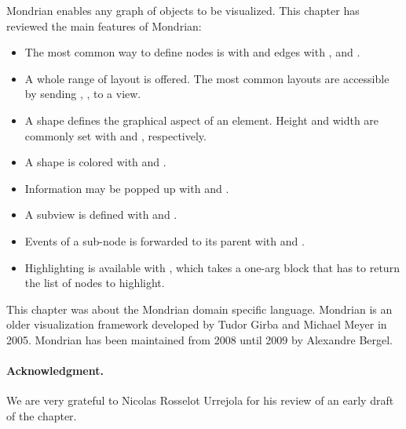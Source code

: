\documentclass[a4paper,10pt,twoside]{book}
\begin{document}
Mondrian enables any graph of objects to be visualized. This chapter has reviewed the main features of Mondrian:
\begin{itemize}
\item The most common way to define nodes is with  and edges with ,  and .
\item A whole range of layout is offered. The most common layouts are accessible by sending , ,  to a view.
\item A shape defines the graphical aspect of an element. Height and width are commonly set with  and , respectively. 
\item A shape is colored with  and .
\item Information may be popped up with  and .
\item A subview is defined with  and .
\item Events of a sub-node is forwarded to its parent with  and .
\item Highlighting is available with , which takes a one-arg block that has to return the list of nodes to highlight.
\end{itemize}

This chapter was about the Mondrian domain specific language. 
Mondrian is an older visualization framework developed by Tudor Girba and Michael Meyer in 2005. Mondrian has been maintained from 2008 until 2009 by Alexandre Bergel. 


\paragraph{Acknowledgment.}
We are very grateful to Nicolas Rosselot Urrejola for his review of an early draft of the chapter.


\ifx\wholebook\relax\else
   
   
\end{document}
